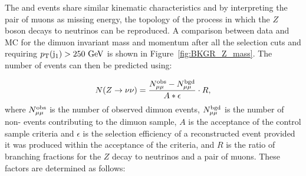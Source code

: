 The \zmumu and \znunu events share similar kinematic characteristics and by interpreting the pair of muons as missing energy, the topology of the process in which the $Z$ boson decays to neutrinos can be reproduced.  
A comparison between data and MC for the dimuon invariant mass and momentum after all the selection cuts and requiring $p_{\text{T}}({\rm j}_1)>250~\mathrm{GeV}$ is shown in Figure~\ref{fig:BKGR_Z_mass}.
The number of \znunu events can then be predicted using:

\begin{equation}
N(Z\rightarrow\nu\nu) = \frac{N^{\rm obs}_{\mu\mu} - N^{\rm bgd}_{\mu\mu}}{A*\epsilon}\cdot R ,
\label{eq:znunudatadriven}
\end{equation}
where $N^{\rm obs}_{\mu\mu}$ is the number of observed dimuon events, $N^{\rm bgd}_{\mu\mu}$ is the number of non-\zmumubr{} events contributing to the dimuon sample, $A$ is the acceptance of the control sample criteria and $\epsilon$ is the selection efficiency of a reconstructed event provided it was produced within the acceptance of the criteria, and $R$ is the ratio of branching fractions for the $Z$ decay to neutrinos and a pair of muons. These factors are determined as follows:

